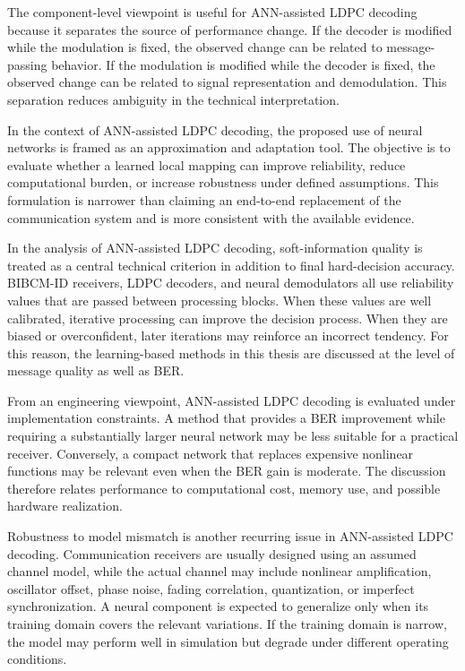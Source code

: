 The component-level viewpoint is useful for ANN-assisted LDPC decoding because it separates the source of performance change. If the decoder is modified while the modulation is fixed, the observed change can be related to message-passing behavior. If the modulation is modified while the decoder is fixed, the observed change can be related to signal representation and demodulation. This separation reduces ambiguity in the technical interpretation.

In the context of ANN-assisted LDPC decoding, the proposed use of neural networks is framed as an approximation and adaptation tool. The objective is to evaluate whether a learned local mapping can improve reliability, reduce computational burden, or increase robustness under defined assumptions. This formulation is narrower than claiming an end-to-end replacement of the communication system and is more consistent with the available evidence.

In the analysis of ANN-assisted LDPC decoding, soft-information quality is treated as a central technical criterion in addition to final hard-decision accuracy. BIBCM-ID receivers, LDPC decoders, and neural demodulators all use reliability values that are passed between processing blocks. When these values are well calibrated, iterative processing can improve the decision process. When they are biased or overconfident, later iterations may reinforce an incorrect tendency. For this reason, the learning-based methods in this thesis are discussed at the level of message quality as well as BER.

From an engineering viewpoint, ANN-assisted LDPC decoding is evaluated under implementation constraints. A method that provides a BER improvement while requiring a substantially larger neural network may be less suitable for a practical receiver. Conversely, a compact network that replaces expensive nonlinear functions may be relevant even when the BER gain is moderate. The discussion therefore relates performance to computational cost, memory use, and possible hardware realization.

Robustness to model mismatch is another recurring issue in ANN-assisted LDPC decoding. Communication receivers are usually designed using an assumed channel model, while the actual channel may include nonlinear amplification, oscillator offset, phase noise, fading correlation, quantization, or imperfect synchronization. A neural component is expected to generalize only when its training domain covers the relevant variations. If the training domain is narrow, the model may perform well in simulation but degrade under different operating conditions.

